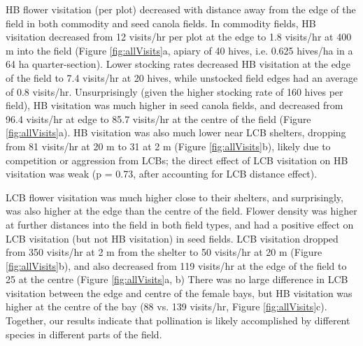 \documentclass[12pt]{article} %
\begin{document}
HB flower visitation (per plot) decreased with distance away from the edge of the field in both commodity and seed canola fields.
In commodity fields, HB visitation decreased from 12 visits/hr per plot at the edge to 1.8 visits/hr at 400 m into the field (Figure \ref{fig:allVisits}a, apiary of 40 hives, i.e. 0.625 hives/ha in a 64 ha quarter-section).
Lower stocking rates decreased HB visitation at the edge of the field to 7.4 visits/hr at 20 hives, while unstocked field edges had an average of 0.8 visits/hr.
Unsurprisingly (given the higher stocking rate of 160 hives per field), HB visitation was much higher in seed canola fields, and decreased from 96.4 visits/hr at edge to 85.7 visits/hr at the centre of the field (Figure \ref{fig:allVisits}a). 
HB visitation was also much lower near LCB shelters, dropping from 81 visits/hr at 20 m to 31 at 2 m (Figure \ref{fig:allVisits}b), likely due to competition or aggression from LCBs; the direct effect of LCB visitation on HB visitation was weak (p = 0.73, after accounting for LCB distance effect).


LCB flower visitation was much higher close to their shelters, and surprisingly, was also higher at the edge than the centre of the field.
Flower density was higher at further distances into the field in both field types, and had a positive effect on LCB visitation (but not HB visitation) in seed fields.
LCB visitation dropped from 350 visits/hr at 2 m from the shelter to 50 visits/hr at 20 m (Figure \ref{fig:allVisits}b), and also decreased from 119 visits/hr at the edge of the field to 25 at the centre (Figure \ref{fig:allVisits}a, b)
There was no large difference in LCB visitation between the edge and centre of the female bays, but HB visitation was higher at the centre of the bay (88 vs. 139 visits/hr, Figure \ref{fig:allVisits}c).
Together, our results indicate that pollination is likely accomplished by different species in different parts of the field.
\end{document}
